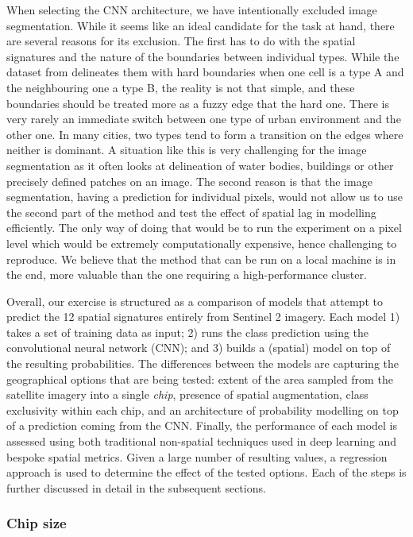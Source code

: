 When selecting the CNN architecture, we have intentionally excluded image
segmentation. While it seems like an ideal candidate for the task at hand, there are
several reasons for its exclusion. The first has to do with the spatial signatures and the
nature of the boundaries between individual types. While the dataset from
\cite{fleischmann2022geographical} delineates them with hard boundaries when one cell
is a type A and the neighbouring one a type B, the reality is not that simple, and these
boundaries should be treated more as a fuzzy edge that the hard one. There is very rarely an immediate
switch between one type of urban environment and the other one. In many cities, two
types tend to form a transition on the edges where neither is dominant. A situation like
this is very challenging for the image segmentation as it often looks at delineation of
water bodies, buildings or other precisely defined patches on an image. The second reason is that the image
segmentation, having a prediction for individual pixels, would not allow us to use the
second part of the method and test the effect of spatial lag in modelling efficiently. The only
way of doing that would be to run the experiment on a pixel level which would be
extremely computationally expensive, hence challenging to reproduce. We believe that the
method that can be run on a local machine is in the end, more valuable than the one
requiring a high-performance cluster.

Overall, our exercise is structured as a comparison of models that attempt to
predict the 12 spatial signatures entirely from Sentinel 2 imagery. Each model 1) takes
a set of training data as input; 2) runs the class prediction using the convolutional neural
network (CNN); and 3) builds a (spatial) model on top of the resulting probabilities. The
differences between the models are capturing the geographical options that are being tested:
extent of the area sampled from the satellite imagery into a single \textit{chip},
presence of spatial augmentation, class exclusivity within each chip, and an
architecture of probability modelling on top of a prediction coming from the CNN.
Finally, the performance of each model is assessed using both traditional non-spatial
techniques used in deep learning and bespoke spatial metrics. Given a large number of
resulting values, a regression approach is used to determine the effect of the tested
options.
Each of the steps is further discussed in detail in the subsequent sections.

\subsubsection{Chip size}

